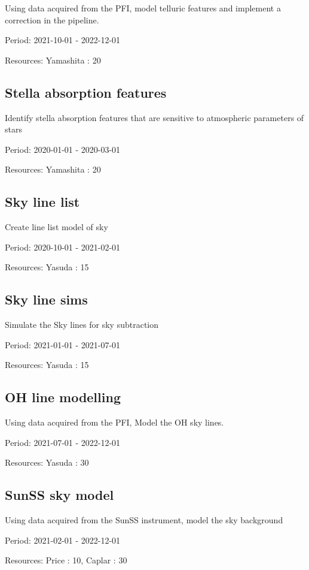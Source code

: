 Using data acquired from the PFI, model telluric features and implement a correction in the pipeline.

Period: 2021-10-01 - 2022-12-01

Resources: Yamashita : 20

\subsection{Stella absorption features}

Identify stella absorption features that are sensitive to atmospheric parameters of stars

Period: 2020-01-01 - 2020-03-01

Resources: Yamashita : 20

\subsection{Sky line list}

Create line list model of sky

Period: 2020-10-01 - 2021-02-01

Resources: Yasuda : 15

\subsection{Sky line sims}

Simulate the Sky lines for sky subtraction

Period: 2021-01-01 - 2021-07-01

Resources: Yasuda : 15

\subsection{OH line modelling}

Using data acquired from the PFI, Model the OH sky lines.

Period: 2021-07-01 - 2022-12-01

Resources: Yasuda : 30

\subsection{SunSS sky model}

Using data acquired from the SunSS instrument, model the sky background

Period: 2021-02-01 - 2022-12-01

Resources: Price : 10, Caplar : 30

